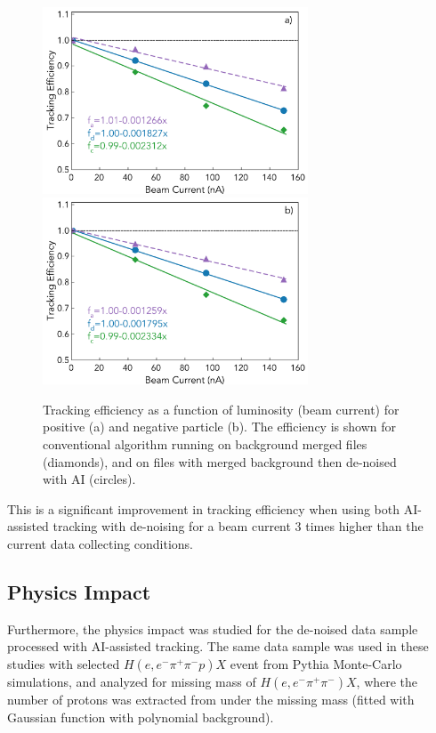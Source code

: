 \begin{figure}[!h]
\begin{center}
 \includegraphics[width=3.1in]{images/figure_lscan_pos_ai.pdf}
 \includegraphics[width=3.1in]{images/figure_lscan_neg_ai.pdf}
\caption {Tracking efficiency as a function of luminosity (beam current) for positive (a) and negative particle (b).  The efficiency is shown for
conventional algorithm running on background merged files (diamonds), and on files with merged background then de-noised with AI (circles).}
 \label{lscan::conv_dn_ai}
 \end{center}
\end{figure}

This is a significant improvement in tracking efficiency when using both AI-assisted tracking with de-noising for a beam current 3 times higher than the current data collecting conditions. 

\subsection{Physics Impact}

Furthermore, the physics impact was studied for the de-noised data sample processed with AI-assisted tracking. The same data 
sample was used in these studies with selected $H(e,e^-\pi^+\pi^-p)X$ event from Pythia Monte-Carlo simulations, and analyzed for
missing mass of $H(e,e^-\pi^+\pi^-)X$, where the number of protons was extracted from under the missing mass 
(fitted with Gaussian function with polynomial background). 



